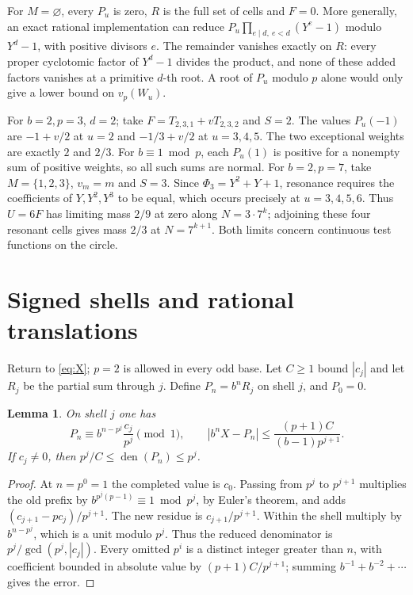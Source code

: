 \documentclass[11pt]{article}
\newtheorem{lemma}[theorem]{Lemma}
\newcommand{\den}{\operatorname{den}}
\begin{document}
For \(M=\varnothing\), every \(P_u\) is zero, \(R\) is the full set of cells and \(F=0\). More generally, an exact rational implementation can reduce \(P_u\prod_{e\mid d,\ e<d}(Y^e-1)\) modulo \(Y^d-1\), with positive divisors \(e\). The remainder vanishes exactly on \(R\): every proper cyclotomic factor of \(Y^d-1\) divides the product, and none of these added factors vanishes at a primitive \(d\)-th root. A root of \(P_u\) modulo \(p\) alone would only give a lower bound on \(v_p(W_u)\).

For \(b=2,p=3\), \(d=2\); take \(F=T_{2,3,1}+vT_{2,3,2}\) and \(S=2\). The values \(P_u(-1)\) are \(-1+v/2\) at \(u=2\) and \(-1/3+v/2\) at \(u=3,4,5\). The two exceptional weights are exactly \(2\) and \(2/3\). For \(b\equiv1\bmod p\), each \(P_u(1)\) is positive for a nonempty sum of positive weights, so all such sums are normal. For \(b=2,p=7\), take \(M=\{1,2,3\}\), \(v_m=m\) and \(S=3\). Since \(\Phi_3=Y^2+Y+1\), resonance requires the coefficients of \(Y,Y^2,Y^3\) to be equal, which occurs precisely at \(u=3,4,5,6\). Thus \(U=6F\) has limiting mass \(2/9\) at zero along \(N=3\cdot7^k\); adjoining these four resonant cells gives mass \(2/3\) at \(N=7^{k+1}\). Both limits concern continuous test functions on the circle.

\section{Signed shells and rational translations}\label{sec:signed}
Return to \eqref{eq:X}; \(p=2\) is allowed in every odd base. Let \(C\ge1\) bound \(|c_j|\) and let \(R_j\) be the partial sum through \(j\). Define \(P_n=b^nR_j\) on shell \(j\), and \(P_0=0\).
\begin{lemma}\label{lem:phase}
On shell \(j\) one has
\[
 P_n\equiv b^{n-p^j}\frac{c_j}{p^j}\pmod1,\qquad
 |b^nX-P_n|\le\frac{(p+1)C}{(b-1)p^{j+1}} .
\]
If \(c_j\ne0\), then \(p^j/C\le\den(P_n)\le p^j\).
\end{lemma}
\begin{proof}
At \(n=p^0=1\) the completed value is \(c_0\). Passing from \(p^j\) to \(p^{j+1}\) multiplies the old prefix by \(b^{p^j(p-1)}\equiv1\bmod p^j\), by Euler's theorem, and adds \((c_{j+1}-pc_j)/p^{j+1}\). The new residue is \(c_{j+1}/p^{j+1}\). Within the shell multiply by \(b^{n-p^j}\), which is a unit modulo \(p^j\). Thus the reduced denominator is \(p^j/\gcd(p^j,|c_j|)\). Every omitted \(p^i\) is a distinct integer greater than \(n\), with coefficient bounded in absolute value by \((p+1)C/p^{j+1}\); summing \(b^{-1}+b^{-2}+\cdots\) gives the error.
\end{proof}
\end{document}
